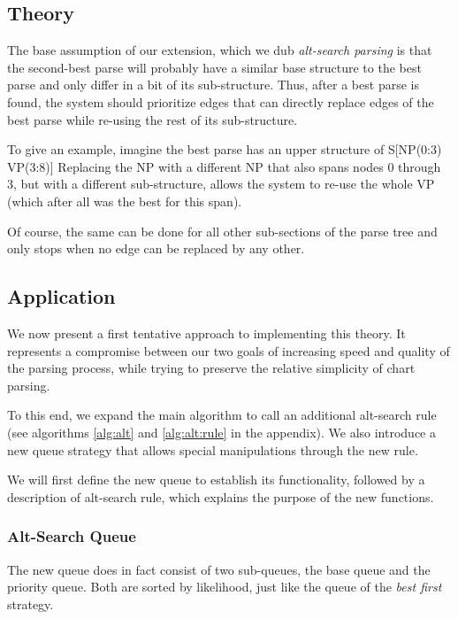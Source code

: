 \documentclass[11pt, titlepage, a4paper]{scrartcl}		%
\newcommand{\xmas}[1]{alt-search#1}
\newcommand{\XMas}[1]{Alt-Search#1}
\begin{document}
\subsection{Theory}
\label{sec:alt:theory}
The base assumption of our extension, which we dub \textit{\xmas{} parsing} is that the second-best parse will probably have a similar base structure to the best parse and only differ in a bit of its sub-structure.
Thus, after a best parse is found, the system should prioritize edges that can directly replace edges of the best parse while re-using the rest of its sub-structure.

To give an example, imagine the best parse has an upper structure of S[NP(0:3) VP(3:8)]
Replacing the NP with a different NP that also spans nodes 0 through 3, but with a different sub-structure, allows the system to re-use the whole VP (which after all was the best for this span).

Of course, the same can be done for all other sub-sections of the parse tree and only stops when no edge can be replaced by any other.

\subsection{Application}
\label{sec:alt:app}
We now present a first tentative approach to implementing this theory.
It represents a compromise between our two goals of increasing speed and quality of the parsing process, while trying to preserve the relative simplicity of chart parsing.

To this end, we expand the main algorithm to call an additional \xmas{} rule (see algorithms \ref{alg:alt} and \ref{alg:alt:rule} in the appendix).
We also introduce a new queue strategy that allows special manipulations through the new rule.

We will first define the new queue to establish its functionality, followed by a description of \xmas{} rule, which explains the purpose of the new functions.

\subsubsection{\XMas{} Queue}
The new queue does in fact consist of two sub-queues, the base queue and the priority queue.
Both are sorted by likelihood, just like the queue of the \textit{best first} strategy.
\end{document}
